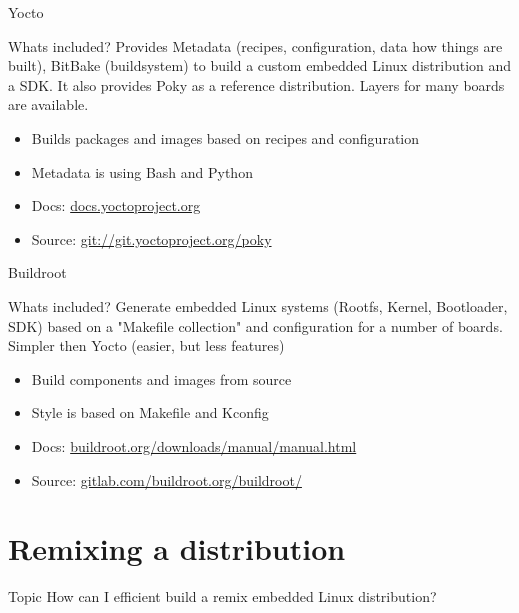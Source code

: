 \documentclass{beamer}
\begin{document}
\begin{frame}{Yocto}
	\begin{block}{Whats included?}
		Provides Metadata (recipes, configuration, data how things are built), BitBake (buildsystem) to build a custom embedded Linux distribution and a SDK. It also provides Poky as a reference distribution. Layers for many boards are available.
	\end{block}

	\begin{itemize}
		\item Builds packages and images based on recipes and configuration
		\item Metadata is using Bash and Python
		\item Docs: \href{https://docs.yoctoproject.org/}{docs.yoctoproject.org}
		\item Source: \url{git://git.yoctoproject.org/poky}
	\end{itemize}
\end{frame}

\begin{frame}{Buildroot}
	\begin{block}{Whats included?}
		Generate embedded Linux systems (Rootfs, Kernel, Bootloader, SDK)  based on a "Makefile collection" and configuration for a number of boards. Simpler then Yocto (easier, but less features)
	\end{block}

	\begin{itemize}
		\item Build components and images from source
		\item Style is based on Makefile and Kconfig 
		\item Docs: \href{https://buildroot.org/downloads/manual/manual.html}{buildroot.org/downloads/manual/manual.html}
		\item Source: \href{https://gitlab.com/buildroot.org/buildroot/}{gitlab.com/buildroot.org/buildroot/}
	\end{itemize}
\end{frame}

\section{Remixing a distribution}

\begin{frame}
	\begin{block}{Topic}
		How can I efficient build a remix embedded Linux distribution?
	\end{block}
\end{frame}
\end{document}
